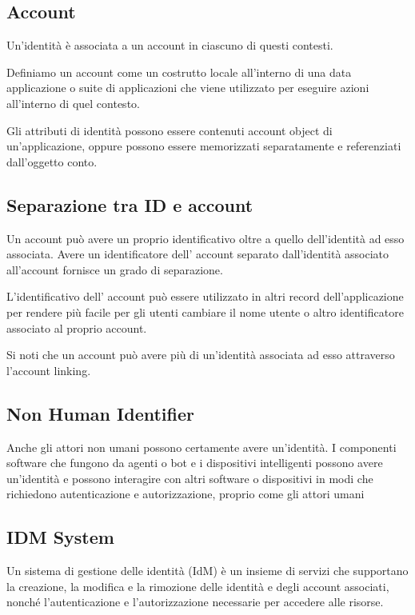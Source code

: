\subsection{Account}

Un'identità è associata a un account in ciascuno di questi contesti.

Definiamo un account come un costrutto locale all'interno di una data applicazione o suite di applicazioni che viene utilizzato per eseguire azioni all'interno di quel contesto.

Gli attributi di identità possono essere contenuti account object di un'applicazione, oppure possono essere memorizzati separatamente e referenziati dall'oggetto conto. 

\subsection{Separazione tra ID e account}

Un account può avere un proprio identificativo oltre a quello dell'identità ad esso associata. Avere un identificatore dell' account separato dall'identità associato all'account fornisce un grado di separazione. 

L'identificativo dell' account può essere utilizzato in altri record dell'applicazione per rendere più facile per gli utenti cambiare il nome utente o altro identificatore associato al proprio account.  

Si noti che un account può avere più di un'identità associata ad esso attraverso l'account linking.

\subsection{Non Human Identifier}

Anche gli attori non umani possono certamente avere un'identità.
I componenti software che fungono da agenti o bot e i dispositivi intelligenti possono avere un'identità e possono interagire con altri software o dispositivi in modi che richiedono autenticazione e autorizzazione, proprio come gli attori umani

\subsection{IDM System}

Un sistema di gestione delle identità (IdM) è un insieme di servizi che supportano la creazione, la modifica e la rimozione delle identità e degli account associati, nonché l'autenticazione e l'autorizzazione necessarie per accedere alle risorse.

